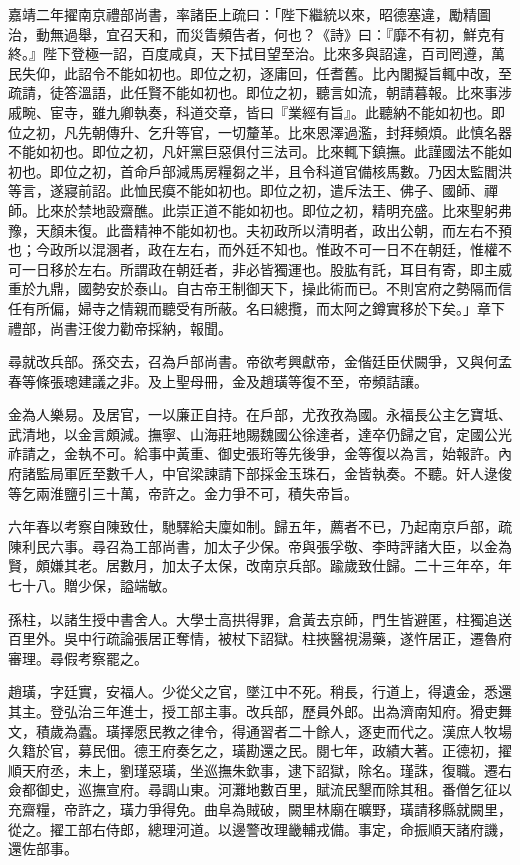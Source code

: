 \begin{pinyinscope}
嘉靖二年擢南京禮部尚書，率諸臣上疏曰：「陛下繼統以來，昭德塞違，勵精圖治，動無過舉，宜召天和，而災眚頻告者，何也？《詩》曰：『靡不有初，鮮克有終。』陛下登極一詔，百度咸貞，天下拭目望至治。比來多與詔違，百司罔遵，萬民失仰，此詔令不能如初也。即位之初，逐庸回，任耆舊。比內閣擬旨輒中改，至疏請，徒答溫語，此任賢不能如初也。即位之初，聽言如流，朝請暮報。比來事涉戚畹、宦寺，雖九卿執奏，科道交章，皆曰『業經有旨』。此聽納不能如初也。即位之初，凡先朝傳升、乞升等官，一切釐革。比來恩澤過濫，封拜頻煩。此慎名器不能如初也。即位之初，凡奸黨巨惡俱付三法司。比來輒下鎮撫。此謹國法不能如初也。即位之初，首命戶部減馬房糧芻之半，且令科道官備核馬數。乃因太監閻洪等言，遂寢前詔。此恤民瘼不能如初也。即位之初，遣斥法王、佛子、國師、禪師。比來於禁地設齋醮。此崇正道不能如初也。即位之初，精明充盛。比來聖躬弗豫，天顏未復。此嗇精神不能如初也。夫初政所以清明者，政出公朝，而左右不預也；今政所以混溷者，政在左右，而外廷不知也。惟政不可一日不在朝廷，惟權不可一日移於左右。所謂政在朝廷者，非必皆獨運也。股肱有託，耳目有寄，即主威重於九鼎，國勢安於泰山。自古帝王制御天下，操此術而已。不則宮府之勢隔而信任有所偏，婦寺之情親而聽受有所蔽。名曰總攬，而太阿之鐏實移於下矣。」章下禮部，尚書汪俊力勸帝採納，報聞。

尋就改兵部。孫交去，召為戶部尚書。帝欲考興獻帝，金偕廷臣伏闕爭，又與何孟春等條張璁建議之非。及上聖母冊，金及趙璜等復不至，帝頻詰讓。

金為人樂易。及居官，一以廉正自持。在戶部，尤孜孜為國。永福長公主乞寶坻、武清地，以金言頗減。撫寧、山海莊地賜魏國公徐達者，達卒仍歸之官，定國公光祚請之，金執不可。給事中黃重、御史張珩等先後爭，金等復以為言，始報許。內府諸監局軍匠至數千人，中官梁諫請下部採金玉珠石，金皆執奏。不聽。奸人逯俊等乞兩淮鹽引三十萬，帝許之。金力爭不可，積失帝旨。

六年春以考察自陳致仕，馳驛給夫廩如制。歸五年，薦者不已，乃起南京戶部，疏陳利民六事。尋召為工部尚書，加太子少保。帝與張孚敬、李時評諸大臣，以金為賢，頗嫌其老。居數月，加太子太保，改南京兵部。踰歲致仕歸。二十三年卒，年七十八。贈少保，謚端敏。

孫柱，以諸生授中書舍人。大學士高拱得罪，倉黃去京師，門生皆避匿，柱獨追送百里外。吳中行疏論張居正奪情，被杖下詔獄。柱挾醫視湯藥，遂忤居正，遷魯府審理。尋假考察罷之。

趙璜，字廷實，安福人。少從父之官，墜江中不死。稍長，行道上，得遺金，悉還其主。登弘治三年進士，授工部主事。改兵部，歷員外郎。出為濟南知府。猾吏舞文，積歲為蠹。璜擇愿民教之律令，得通習者二十餘人，逐吏而代之。漢庶人牧場久籍於官，募民佃。德王府奏乞之，璜勘還之民。閱七年，政績大著。正德初，擢順天府丞，未上，劉瑾惡璜，坐巡撫朱欽事，逮下詔獄，除名。瑾誅，復職。遷右僉都御史，巡撫宣府。尋調山東。河灘地數百里，賦流民墾而除其租。番僧乞征以充齋糧，帝許之，璜力爭得免。曲阜為賊破，闕里林廟在曠野，璜請移縣就闕里，從之。擢工部右侍郎，總理河道。以邊警改理畿輔戎備。事定，命振順天諸府譏，還佐部事。


\end{pinyinscope}

